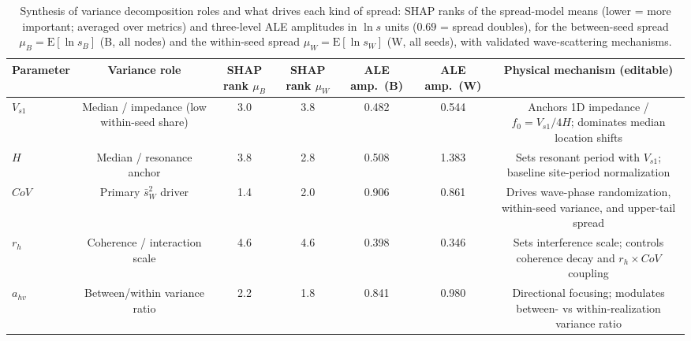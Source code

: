 \begin{table}[!ht]
\caption{Synthesis of variance decomposition roles and what drives each kind of spread: SHAP ranks of the spread-model means (lower = more important; averaged over metrics) and three-level ALE amplitudes in $\ln s$ units ($0.69$ = spread doubles), for the between-seed spread $\mu_B=\mathrm{E}[\ln s_B]$ (B, all nodes) and the within-seed spread $\mu_W=\mathrm{E}[\ln s_W]$ (W, all seeds), with validated wave-scattering mechanisms.\label{tab:synthesis}}
\begin{tabular*}{\textwidth}{@{\extracolsep{\fill}}lcccccc@{}}
\toprule
Parameter & Variance role & SHAP rank $\mu_B$ & SHAP rank $\mu_W$ & ALE amp.\ (B) & ALE amp.\ (W) & Physical mechanism (editable) \\
\midrule
$V_{s1}$ & Median / impedance (low within-seed share) & 3.0 & 3.8 & 0.482 & 0.544 & Anchors 1D impedance / $f_0=V_{s1}/4H$; dominates median location shifts \\
$H$ & Median / resonance anchor & 3.8 & 2.8 & 0.508 & 1.383 & Sets resonant period with $V_{s1}$; baseline site-period normalization \\
$CoV$ & Primary $\bar s_W^2$ driver & 1.4 & 2.0 & 0.906 & 0.861 & Drives wave-phase randomization, within-seed variance, and upper-tail spread \\
$r_h$ & Coherence / interaction scale & 4.6 & 4.6 & 0.398 & 0.346 & Sets interference scale; controls coherence decay and $r_h\times CoV$ coupling \\
$a_{hv}$ & Between/within variance ratio & 2.2 & 1.8 & 0.841 & 0.980 & Directional focusing; modulates between- vs within-realization variance ratio \\
\bottomrule
\end{tabular*}
\end{table}
